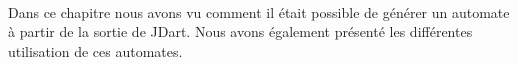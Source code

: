 \paragraph{}
Dans ce chapitre nous avons vu comment il était possible de générer un 
automate à partir de la sortie de JDart. Nous avons également présenté les 
différentes utilisation de ces automates. 

